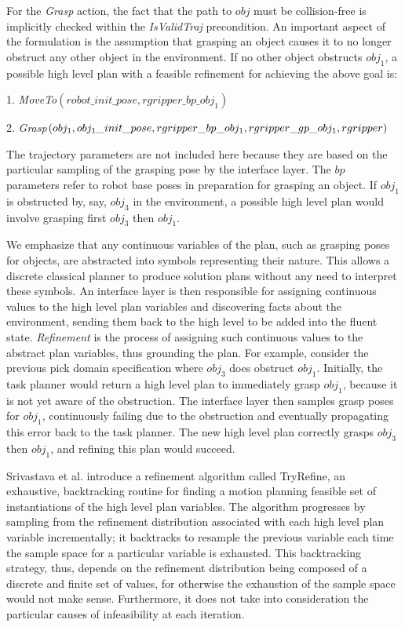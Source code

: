 For the \emph{Grasp} action, the fact that the path to $obj$ must be collision-free is
implicitly checked within the \emph{IsValidTraj} precondition. An important aspect of
the formulation is the assumption that grasping an object causes it to no longer
obstruct any other object in the environment. If no other object obstructs $obj_{1}$,
a possible high level plan with a feasible refinement for achieving the above goal is:
\begin{tightlist}
\item[1.] \emph{MoveTo}$(robot\_init\_pose, rgripper\_bp\_obj_{1})$
\item[2.] \emph{Grasp}$(obj_{1}, obj_{1}\_init\_pose, rgripper\_bp\_obj_{1},\\rgripper\_gp\_obj_{1}, rgripper)$
\end{tightlist}

The trajectory parameters are not included here because they are based on the
particular sampling of the grasping pose by the interface layer. The $bp$ parameters
refer to robot base poses in preparation for grasping an object. If $obj_{1}$ is
obstructed by, say, $obj_{3}$ in the environment, a possible high level plan would involve
grasping first $obj_{3}$ then $obj_{1}$.

We emphasize that any continuous variables of the plan, such as grasping poses for
objects, are abstracted into symbols representing their nature. This allows a discrete
classical planner to produce solution plans without any need to interpret these
symbols. An interface layer is then responsible for assigning continuous values to
the high level plan variables and discovering facts about the environment, sending
them back to the high level to be added into the fluent state. \emph{Refinement} is the
process of assigning such continuous values to the abstract plan variables, thus grounding the plan. 
For example, consider the previous pick domain specification where $obj_{3}$ does obstruct $obj_{1}$.
Initially, the task planner would return a high level plan to immediately grasp $obj_{1}$, because
it is not yet aware of the obstruction. The interface layer then samples grasp poses
for $obj_{1}$, continuously failing due to the obstruction and eventually propagating
this error back to the task planner. The new high level plan correctly grasps $obj_{3}$ then $obj_{1}$,
and refining this plan would succeed.

Srivastava et al. introduce a refinement algorithm called TryRefine, an exhaustive, backtracking routine for
finding a motion planning feasible set of instantiations of the high level plan
variables. The algorithm progresses by sampling from the refinement
distribution associated with each high level plan variable incrementally; it backtracks
to resample the previous variable each time the sample space for a particular variable
is exhausted. This backtracking strategy, thus, depends on the refinement distribution
being composed of a discrete and finite set of values, for otherwise the exhaustion
of the sample space would not make sense. Furthermore, it does not take into consideration
the particular causes of infeasibility at each iteration.